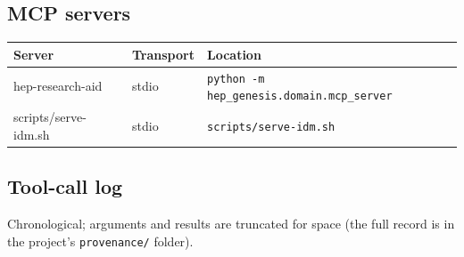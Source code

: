 \documentclass[11pt,a4paper]{article}
\begin{document}
\subsection{MCP servers}
\begin{longtable}{@{}p{}p{}p{}@{}}
\toprule Server & Transport & Location \\ \midrule \endhead
hep-research-aid & stdio & \texttt{python -m hep\_\allowbreak{}genesis.domain.mcp\_\allowbreak{}server} \\
scripts/serve-idm.sh & stdio & \texttt{scripts/\allowbreak{}serve-idm.sh} \\
\bottomrule\end{longtable}
\subsection{Tool-call log}
Chronological; arguments and results are truncated for space (the full record is in the project's \texttt{provenance/} folder).
\end{document}

